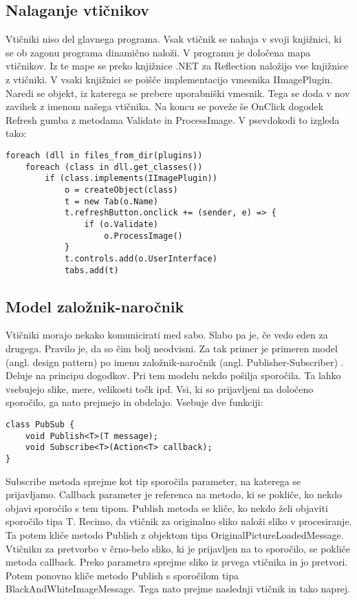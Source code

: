 \documentclass[oneside, a4paper, 12pt]{book}
\begin{document}
\subsection{Nalaganje vtičnikov}
Vtičniki niso del glavnega programa. Vsak vtičnik se nahaja v svoji knjižnici, ki se ob zagonu programa dinamično naloži. V programu je določena mapa vtičnikov. Iz te mape se preko knjižnice .NET za Reflection \cite{oreilly-cs} naložijo vse knjižnice z vtičniki. V vsaki knjižnici se poišče implementacijo vmesnika IImagePlugin. Naredi se objekt, iz katerega se prebere uporabniški vmesnik. Tega se doda v nov zavihek z imenom našega vtičnika. Na koncu se poveže še OnClick dogodek Refresh gumba z metodama Validate in ProcessImage. V psevdokodi to izgleda tako:
\begin{samepage}
\begin{verbatim}
foreach (dll in files_from_dir(plugins))
    foreach (class in dll.get_classes())
        if (class.implements(IImagePlugin))
            o = createObject(class)
            t = new Tab(o.Name)
            t.refreshButton.onclick += (sender, e) => {
                if (o.Validate)
                    o.ProcessImage()
            }
            t.controls.add(o.UserInterface)
            tabs.add(t)
\end{verbatim}
\end{samepage}

\subsection{Model založnik-naročnik}
Vtičniki morajo nekako komunicirati med sabo. Slabo pa je, če vedo eden za drugega. Pravilo je, da so čim bolj neodvisni. Za tak primer je primeren model (angl. design pattern) po imenu založnik-naročnik (angl. Publisher-Subscriber) \cite{oreilly-dp, oreilly-cs}. Deluje na principu dogodkov. Pri tem modelu nekdo pošilja sporočila. Ta lahko vsebujejo slike, mere, velikosti točk ipd. Vsi, ki so prijavljeni na določeno sporočilo, ga nato prejmejo in obdelajo. Vsebuje dve funkciji:
\begin{samepage}
\begin{verbatim}
class PubSub {
    void Publish<T>(T message);
    void Subscribe<T>(Action<T> callback);
}
\end{verbatim}
\end{samepage}
Subscribe metoda sprejme kot tip sporočila parameter, na katerega se prijavljamo. Callback parameter je referenca na metodo, ki se pokliče, ko nekdo objavi sporočilo s tem tipom. Publish metoda se kliče, ko nekdo želi objaviti sporočilo tipa T. Recimo, da vtičnik za originalno sliko naloži sliko v procesiranje. Ta potem kliče metodo Publish z objektom tipa OriginalPictureLoadedMessage. Vtičniku za pretvorbo v črno-belo sliko, ki je prijavljen na to sporočilo, se pokliče metoda callback. Preko parametra sprejme sliko iz prvega vtičnika in jo pretvori. Potem ponovno kliče metodo Publish s sporočilom tipa Black\-And\-White\-Image\-Message. Tega nato prejme naslednji vtičnik in tako naprej.
\end{document}
